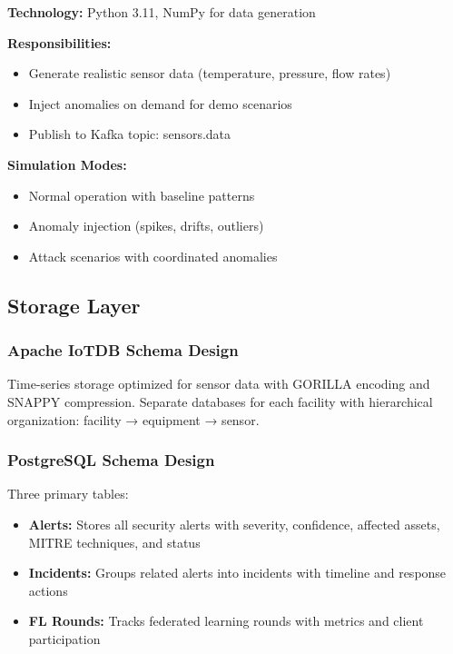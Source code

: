 \documentclass[12pt,a4paper]{article}
\begin{document}
\textbf{Technology:} Python 3.11, NumPy for data generation

\textbf{Responsibilities:}
\begin{itemize}[leftmargin=1cm,itemsep=0pt]
    \item Generate realistic sensor data (temperature, pressure, flow rates)
    \item Inject anomalies on demand for demo scenarios
    \item Publish to Kafka topic: sensors.data
\end{itemize}

\textbf{Simulation Modes:}
\begin{itemize}[leftmargin=1cm,itemsep=0pt]
    \item Normal operation with baseline patterns
    \item Anomaly injection (spikes, drifts, outliers)
    \item Attack scenarios with coordinated anomalies
\end{itemize}

\subsection{Storage Layer}

\subsubsection{Apache IoTDB Schema Design}

Time-series storage optimized for sensor data with GORILLA encoding and SNAPPY compression. Separate databases for each facility with hierarchical organization: facility → equipment → sensor.

\subsubsection{PostgreSQL Schema Design}

Three primary tables:
\begin{itemize}[leftmargin=1cm,itemsep=0pt]
    \item \textbf{Alerts:} Stores all security alerts with severity, confidence, affected assets, MITRE techniques, and status
    \item \textbf{Incidents:} Groups related alerts into incidents with timeline and response actions
    \item \textbf{FL Rounds:} Tracks federated learning rounds with metrics and client participation
\end{itemize}
\end{document}

